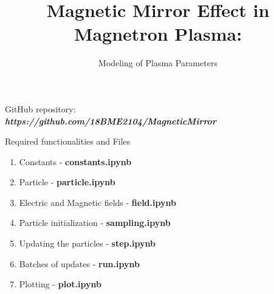\documentclass{beamer}
\title[]{Magnetic Mirror Effect in Magnetron Plasma:}
\subtitle{Modeling of Plasma Parameters}
\begin{document}
	
	\begin{frame}
		\titlepage	
	\end{frame}	
	
	\begin{frame}
		\begin{block}{GitHub repository:} 
		 \phantom{a} \\
		 \hspace{1.5cm}
		 \textbf{\textit{https://github.com/18BME2104/MagneticMirror}} \\
		\phantom{a}
		\end{block}
	\vspace{0.5cm}
		\begin{block}{Required functionalities and Files}
			\begin{enumerate}
				\item Constants - \textbf{constants.ipynb}
				\item Particle - \textbf{particle.ipynb}
				\item Electric and Magnetic fields - \textbf{field.ipynb}
				\item Particle initialization - \textbf{sampling.ipynb}
				\item Updating the particles - \textbf{step.ipynb}
				\item Batches of updates - \textbf{run.ipynb}
				\item Plotting - \textbf{plot.ipynb}
			\end{enumerate}	
		\end{block}
		
	\end{frame}
\end{document}

